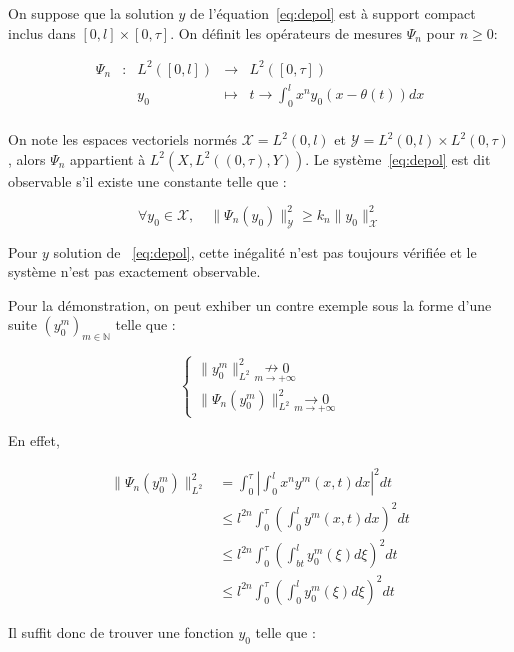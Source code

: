 \documentclass[a4paper]{article}
\theoremstyle{definition}
\theoremstyle{remark}
\begin{document}
On suppose que la solution $y$ de l'équation~\eqref{eq:depol} est à support compact inclus dans $[0,l] \times [0,\tau]$. On définit les opérateurs de mesures $\Psi_n$ pour $n \geq 0$:

 \begin{equation}
	\begin{array}{ccccc}
	\Psi_n & : & L^2([0,l]) & \to & L^2([0,\tau]) \\
	 & & y_0 & \mapsto & t \to \int_0^l x^n y_0(x-\theta(t)) dx\\
	\end{array}
\end{equation}

On note les espaces vectoriels normés $\mathscr{X} = L^2 (0,l)$ et $\mathscr{Y} = L^2 (0,l) \times L^2 (0,\tau)$, alors $\Psi_n$ appartient à $L^2(X,L^2((0,\tau),Y))$. Le système~\eqref{eq:depol} est dit observable s'il existe une constante telle que :

\begin{equation}
	\label{obs}
	\forall y_0 \in \mathscr{X}, \quad \| \Psi_n(y_0)\|_{\mathscr{Y}}^2 \geq k_n \|y_0\|^2_{\mathscr{X}}
\end{equation}

Pour $y$ solution de ~\eqref{eq:depol}, cette inégalité n'est pas toujours vérifiée et le système n'est pas exactement observable.

Pour la démonstration, on peut exhiber un contre exemple sous la forme d'une suite $(y_0^m)_{m \in \mathbb{N}}$ telle que :

\[
\begin{cases}
	\|y_0^m\|^2_{L^2} \underset{m\to+\infty}{\nrightarrow 0} \\
	\| \Psi_n (y_0^m)\|_{L^2}^2 \underset{m\to+\infty}{\rightarrow 0}
\end{cases}
\]
	
En effet,

\[ 
\begin{split}
	\| \Psi_n (y_0^m)\|_{L^2}^2  &= \int_0^\tau  |\int_0^l x^n y^m(x,t) dx |^2 dt \\
	                             & \leq l^{2n}  \int_0^\tau (\int_0^l y^m(x,t)dx)^2dt \\
								 & \leq l^{2n} \int_0^\tau (\int_{bt}^l y_0^m(\xi)d\xi)^2dt \\
								 & \leq l^{2n} \int_0^\tau (\int_0^l y_0^m(\xi)d\xi)^2 dt
\end{split}
\]

Il suffit donc de trouver une fonction $y_0$ telle que :
\end{document}
